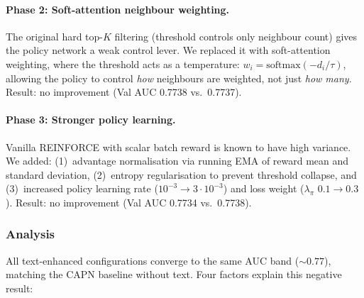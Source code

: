 \paragraph{Phase 2: Soft-attention neighbour weighting.}
The original hard top-$K$ filtering (threshold controls only neighbour count) gives the policy network a weak control lever. We replaced it with soft-attention weighting, where the threshold acts as a temperature: $w_i = \mathrm{softmax}(-d_i / \tau)$, allowing the policy to control \emph{how} neighbours are weighted, not just \emph{how many}. Result: no improvement (Val AUC 0.7738 vs.\ 0.7737).

\paragraph{Phase 3: Stronger policy learning.}
Vanilla REINFORCE with scalar batch reward is known to have high variance. We added: (1)~advantage normalisation via running EMA of reward mean and standard deviation, (2)~entropy regularisation to prevent threshold collapse, and (3)~increased policy learning rate ($10^{-3}\to 3\cdot 10^{-3}$) and loss weight ($\lambda_\pi$ $0.1\to 0.3$). Result: no improvement (Val AUC 0.7734 vs.\ 0.7738).

\subsubsection{Analysis}

All text-enhanced configurations converge to the same AUC band ($\sim 0.77$), matching the CAPN baseline without text. Four factors explain this negative result:


